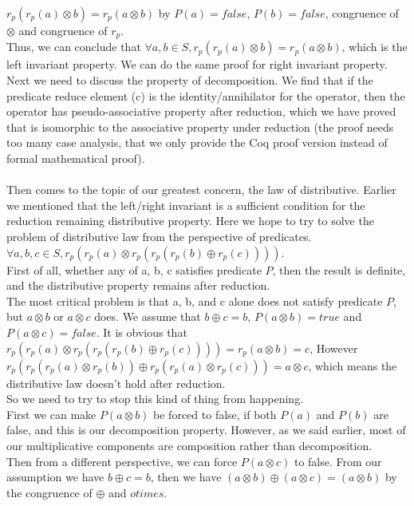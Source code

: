 \documentclass[a4paper,10pt]{article}
\begin{document}
$r_p(r_p(a) \otimes b) = r_p(a \otimes b)$ by $P(a) = false$, $P(b) = false$, congruence of $\otimes$ and congruence of $r_p$.\\
Thus, we can conclude that $\forall a,b \in S, r_p(r_p(a) \otimes b) = r_p(a \otimes b)$, which is the left invariant property. We can do the same proof for right invariant property.\\
Next we need to discuss the property of decomposition. We find that if the predicate reduce element (c) is the identity/annihilator for the operator, then the operator has pseudo-associative property after reduction, which we have proved that is isomorphic to the associative property under reduction (the proof needs too many case analysis, that we only provide the Coq proof version instead of formal mathematical proof).\\\\
Then comes to the topic of our greatest concern, the law of distributive. Earlier we mentioned that the left/right invariant is a sufficient condition for the reduction remaining distributive property. Here we hope to try to solve the problem of distributive law from the perspective of predicates.\\
$\forall a,b,c \in S, r_p(r_p(a) \otimes r_p(r_p(r_p(b) \oplus r_p(c))))$. \\
First of all, whether any of a, b, c satisfies predicate $P$, then the result is definite, and the distributive property remains after reduction.\\
The most critical problem is that a, b, and c alone does not satisfy predicate $P$, but $a \otimes b$ or $a \otimes c$ does. We assume that $b \oplus c = b$, $P(a \otimes b) = true$ and $P(a \otimes c) = false$. It is obvious that $r_p(r_p(a) \otimes r_p(r_p(r_p(b) \oplus r_p(c)))) = r_p(a \otimes b) = c$, However $r_p(r_p(r_p(a) \otimes r_p(b)) \oplus r_p(r_p(a) \otimes r_p(c))) = a \otimes c$, which means the distributive law doesn't hold after reduction.\\
So we need to try to stop this kind of thing from happening.\\
First we can make $P(a \otimes b)$ be forced to false, if both $P(a)$ and $P(b)$ are false, and this is our decomposition property. However, as we said earlier, most of our multiplicative components are composition rather than decomposition.\\
Then from a different perspective, we can force $P(a\otimes c)$ to false. From our assumption we have $b \oplus c = b$, then we have $(a \otimes b) \oplus (a \otimes c) = (a \otimes b)$ by the congruence of $\oplus$ and $otimes$. 
\end{document}
